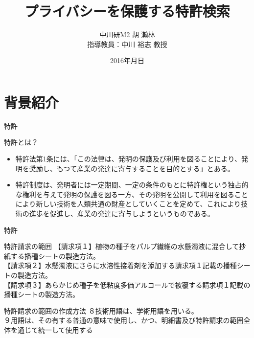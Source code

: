 \documentclass[14pt,xcolor=dvipsnames,table,dvipdfmx]{beamer}
\title{\bfseries プライバシーを保護する特許検索}
\date{2016年月日}
\author{中川研M2 胡 瀚林 \\ 指導教員：中川 裕志 教授}
\begin{document}
\maketitle
\frame{\tableofcontents[hideallsubsections]}

\section{背景紹介}
\begin{frame}{特許}
	\begin{block}{特許とは？}
		\begin{itemize}
        \item 特許法第1条には、「この法律は、発明の保護及び利用を図ることにより、発明を奨励し、もつて産業の発達に寄与することを目的とする」とある。
		\item 特許制度は、発明者には一定期間、一定の条件のもとに特許権という独占的な権利を与えて発明の保護を図る一方、その発明を公開して利用を図ることにより新しい技術を人類共通の財産としていくことを定めて、これにより技術の進歩を促進し、産業の発達に寄与しようというものである。
		\end{itemize}
	\end{block}
\end{frame}

\begin{frame}{特許}
    \begin{exampleblock}{特許請求の範囲}
		【請求項１】植物の種子をパルプ繊維の水懸濁液に混合して抄紙する播種シートの製造方法。\\
		【請求項２】水懸濁液にさらに水溶性接着剤を添加する請求項１記載の播種シートの製造方法。\\
		【請求項３】あらかじめ種子を低粘度多価アルコールで被覆する請求項１記載の播種シートの製造方法。
    \end{exampleblock}
	\begin{block}{特許請求の範囲の作成方法}
		８技術用語は、学術用語を用いる。\\
		９用語は、その有する普通の意味で使用し、かつ、明細書及び特許請求の範囲全体を通じて統一して使用する	
	\end{block}
\end{frame}
\end{document}
